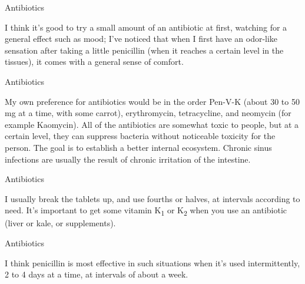 \documentclass[11pt,oneside,openany,extrafontsizes]{memoir}
\begin{document}
\begin{standalonequote}{Antibiotics}

    \begin{answer}
       I think it's good to try a small amount of an antibiotic at first, watching for a general effect such as mood; I've noticed that when I first have an odor-like sensation after taking a little penicillin (when it reaches a certain level in the tissues), it comes with a general sense of comfort. 
    \end{answer}
\end{standalonequote}

\begin{standalonequote}{Antibiotics}

    \begin{answer}
       My own preference for antibiotics would be in the order Pen-V-K (about 30 to 50 mg at a time, with some carrot), erythromycin, tetracycline, and neomycin (for example Kaomycin). All of the antibiotics are somewhat toxic to people, but at a certain level, they can suppress bacteria without noticeable toxicity for the person. The goal is to establish a better internal ecosystem. Chronic sinus infections are usually the result of chronic irritation of the intestine. 
    \end{answer}
\end{standalonequote}

\begin{standalonequote}{Antibiotics}

    \begin{answer}
       I usually break the tablets up, and use fourths or halves, at intervals according to need. It's important to get some vitamin K\textsubscript{1} or K\textsubscript{2} when you use an antibiotic (liver or kale, or supplements).
    \end{answer}
\end{standalonequote}

\begin{standalonequote}{Antibiotics}

    \begin{answer}
       I think penicillin is most effective in such situations when it's used intermittently, 2 to 4 days at a time, at intervals of about a week. 
    \end{answer}
\end{standalonequote}
\end{document}
